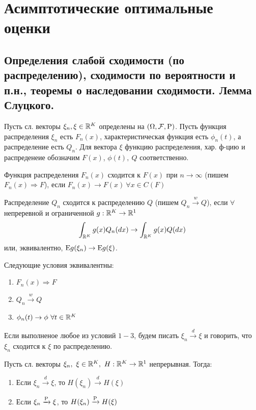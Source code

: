 \section{Асимптотические оптимальные оценки}

\subsection{Определения слабой сходимости (по распределению), сходимости по вероятности и п.н.,
теоремы о наследовании сходимости. Лемма Слуцкого.}

Пусть сл. векторы \(\xi_n, \xi \in \R^K\) определены на \((\Omega, \mathcal{F}, \P)\).
Пусть функция распределения \(\xi_n\) есть \(F_n(x)\), характеристическая функция есть \(\phi_n(t)\), а распределение
есть \(Q_n\). Для вектора \(\xi\) функцию распределения, хар. ф-цию и распреденеие обозначим \(F(x)\),
\(\phi(t),\ Q\) соответственно.

\begin{definition}
    Функция распределения \(F_n(x)\) сходится к \(F(x)\) при \(n \rightarrow \infty\) 
    (пишем \(F_n(x) \Rightarrow F\)), если \(F_n(x) \rightarrow F(x) \ \forall x \in C(F)\)
\end{definition}
\begin{definition}
    Распределение \(Q_n\) сходится к распределению \(Q\)  (пишем \(Q_n \xrightarrow{w} Q\)),
    если \(\forall\) непреревной и ограниченной \(g: \R^K \rightarrow \R^1\)
    \[ \int_{\R^K} g(x)Q_n(dx) \rightarrow \int_{\R^K} g(x)Q(dx)\]
    или, эквивалентно, \(\E g(\xi_n) \rightarrow \E g(\xi)\).
\end{definition}
\begin{theorem}
    Следующие условия эквивалентны:
    \begin{enumerate}
        \item \(F_n(x) \Rightarrow F\)
        \item \(Q_n \xrightarrow{w} Q\)
        \item \(\phi_n(t) \rightarrow \phi \ \forall t \in \R^K\)
    \end{enumerate}
    Если выполненое любое из условий \(1 - 3\), будем писать
    \(\xi_n \xrightarrow{d} \xi\) и говорить, что \(\xi_n\) сходится к \(\xi\) по распределению.
\end{theorem}
\begin{theorem} \label{th::inherit_conv}
    Пусть сл. векторы \(\xi_n,\ \xi\in\R^K,\ H:\R^K\rightarrow\R^1\) непрерывная.
    Тогда:
    \begin{enumerate}
        \item Если \(\xi_n \xrightarrow{d} \xi\), то \(H(\xi_n) \xrightarrow{d} H(\xi)\)
        \item Если \(\xi_n \xrightarrow{\P} \xi\), то \(H(\xi_n) \xrightarrow{\P} H(\xi)\)
    \end{enumerate}
\end{theorem}

